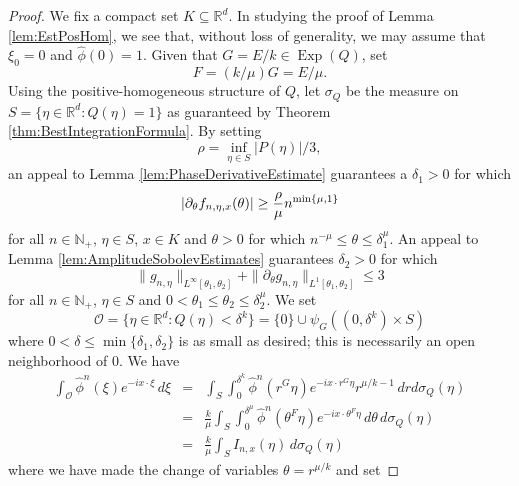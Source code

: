 \documentclass[11pt]{article}
\newcommand\Exp{\operatorname{Exp}}
\newcommand{\p}{\partial}
\begin{document}
\begin{proof}
We fix a compact set $K\subseteq\mathbb{R}^d$. In studying the proof of Lemma \ref{lem:EstPosHom}, we see that, without loss of generality, we may assume that $\xi_0=0$ and $\widehat{\phi}(0)=1$. Given that $G=E/k\in\Exp(Q)$, set
\begin{equation*}
    F=(k/\mu)G=E/\mu.
\end{equation*} Using the positive-homogeneous structure of $Q$, let $\sigma_Q$ be the measure on $S=\{\eta\in \mathbb{R}^d:Q(\eta)=1\}$ as guaranteed by Theorem \ref{thm:BestIntegrationFormula}. By setting
\begin{equation*}
    \rho=\inf_{\eta\in S}|P(\eta)|/3,
\end{equation*}
an appeal to Lemma \ref{lem:PhaseDerivativeEstimate} guarantees a $\delta_1>0$ for which 
\begin{equation}\label{eq:EstImagHom1}
    \abs{\partial_{\theta}f_{n,\eta,x}(\theta)}\geq \frac{\rho}{\mu}n^{\min\{\mu,1\}}
\end{equation} for all $n\in\mathbb{N}_+$, $\eta\in S$, $x\in K$ and $\theta>0$ for which $n^{-\mu}\leq \theta\leq \delta_1^\mu$. An appeal to Lemma \ref{lem:AmplitudeSobolevEstimates} guarantees $\delta_2>0$ for which
\begin{equation}\label{eq:EstImagHom2}
    \|g_{n,\eta}\|_{L^\infty[\theta_1,\theta_2]}
    +
    \|\p_\theta g_{n,\eta} \|_{ L^1[\theta_1,\theta_2]}
    \leq 3
\end{equation}
for all $n\in\mathbb{N}_+$, $\eta\in S$ and $0<\theta_1\leq\theta_2\leq\delta_2^{\mu}$. We set
\begin{equation*}
    \mathcal{O}=\{\eta\in\mathbb{R}^d:Q(\eta)<\delta^k\}=\{0\}\cup \psi_G\left((0,\delta^{k})\times S\right)
\end{equation*}
where $0<\delta\leq \min\{\delta_1,\delta_2\}$ is as small as desired; this is necessarily an open neighborhood of $0$. We have
\begin{eqnarray*}
    \int_{\mathcal{O}}\widehat{\phi}^n(\xi)e^{-ix\cdot\xi}\,d\xi
    &=&
    \int_S\int_0^{\delta^{k}}\widehat{\phi}^n(r^G\eta)e^{-ix\cdot r^G\eta}r^{\mu/k-1}\,dr d\sigma_Q(\eta)\\
    &=&
    \frac{k}{\mu}\int_S \int_0^{\delta^{\mu}} \widehat{\phi}^n(\theta^{F} \eta) e^{-i x\cdot\theta^F \eta}  \,d\theta \,d\sigma_Q(\eta)\\
    &=&
    \frac{k}{\mu}\int_S I_{n,x}(\eta)\,d\sigma_Q(\eta)
\end{eqnarray*}
where we have made the change of variables $\theta=r^{\mu/ k}$ and set

\end{proof}
\end{document}
